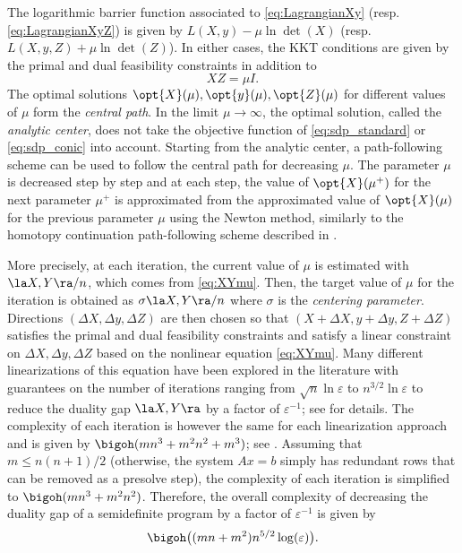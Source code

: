 \documentclass[11pt,twoside,a4paper,openright]{uclouvain-thesis}
\begin{document}
The logarithmic barrier function associated to \eqref{eq:LagrangianXy} (resp. \eqref{eq:LagrangianXyZ}) is given by $L(X, y) - \mu \ln \det(X)$ (resp. $L(X, y, Z) + \mu \ln \det(Z)$).
In either cases, the KKT conditions are given by the primal and dual feasibility constraints
in addition to
\begin{equation}
  \label{eq:XYmu}
  X Z = \mu I.
\end{equation}
The optimal solutions $\opt{X}(\mu), \opt{y}(\mu), \opt{Z}(\mu)$ for different
values of $\mu$ form the \emph{central path}.
In the limit $\mu \to \infty$, the optimal solution, called the \emph{analytic center}, does not take
the objective function of \eqref{eq:sdp_standard} or \eqref{eq:sdp_conic} into account.
Starting from the analytic center, a path-following scheme can be used
to follow the central path for decreasing $\mu$.
The parameter $\mu$ is decreased step by step and at each step,
the value of $\opt{X}(\mu^+)$ for the next parameter $\mu^+$ is approximated from the approximated value
of $\opt{X}(\mu)$ for the previous parameter $\mu$ using the Newton method,
similarly to the homotopy continuation path-following scheme described in .

More precisely, at each iteration, the current value of $\mu$ is estimated with
$\la X, Y \ra / n$, which comes from \eqref{eq:XYmu}.
Then, the target value of $\mu$ for the iteration is obtained as $\sigma \la X, Y \ra / n$
where $\sigma$ is the \emph{centering parameter}.
Directions $(\Delta X, \Delta y, \Delta Z)$ are then chosen so that
$(X + \Delta X, y + \Delta y, Z + \Delta Z)$ satisfies the primal and dual feasibility constraints and
satisfy a linear constraint on $\Delta X, \Delta y, \Delta Z$ based on the
nonlinear equation \eqref{eq:XYmu}.
Many different linearizations of this equation have been explored in the literature with
guarantees on the number of iterations ranging from $\sqrt{n} \ln \varepsilon$ to $n^{3/2} \ln \varepsilon$ to reduce the duality gap $\la X, Y \ra$ by a factor of $\varepsilon^{-1}$;
see \cite{monteiro2000path} for details.
The complexity of each iteration is however the same for each linearization approach
and is given by $\bigoh(mn^3 + m^2n^2 + m^3)$; see \cite{monteiro1999implementation}.
Assuming that $m \le n(n+1)/2$ (otherwise, the system $Ax = b$ simply has redundant rows that can be removed as a presolve step),
the complexity of each iteration is simplified to $\bigoh(mn^3 + m^2n^2)$.
Therefore, the overall complexity of decreasing the duality gap of a semidefinite program
by a factor of $\varepsilon^{-1}$ is given by
\begin{equation}
  \label{eq:sdp_complexity}
  \bigoh\big((mn + m^2)n^{5/2}\log(\varepsilon)\big).
\end{equation}
\end{document}
